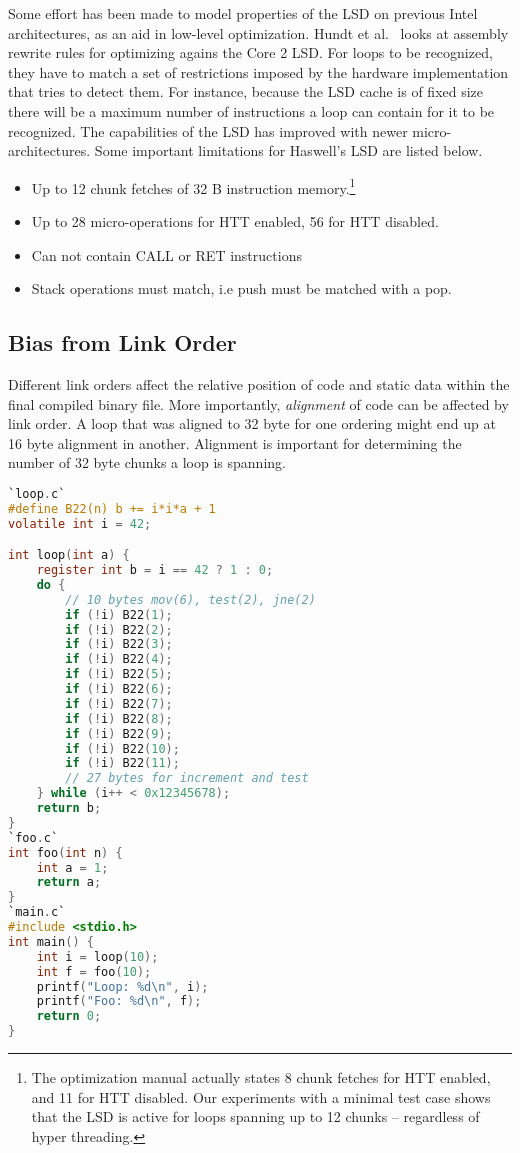 \documentclass[a4paper,10pt,twocolumn,twoside]{article}
\begin{document}
Some effort has been made to model properties of the LSD on previous Intel architectures, as an aid in low-level optimization. 
Hundt et al.~\cite{Hundt:2011:MAO} looks at assembly rewrite rules for optimizing agains the Core 2 LSD.
For loops to be recognized, they have to match a set of restrictions imposed by the hardware implementation that tries to detect them. 
For instance, because the LSD cache is of fixed size there will be a maximum number of instructions a loop can contain for it to be recognized.
The capabilities of the LSD has improved with newer micro-architectures.
Some important limitations for Haswell's LSD are listed below.
\begin{itemize}
  \item Up to 12 chunk fetches of 32 B instruction memory.\footnote{The optimization manual actually states 8 chunk fetches for HTT enabled, and 11 for HTT disabled. Our experiments with a minimal test case shows that the LSD is active for loops spanning up to 12 chunks -- regardless of hyper threading.}
  \item Up to 28 micro-operations for HTT enabled, 56 for HTT disabled.
  \item Can not contain CALL or RET instructions
  \item Stack operations must match, i.e push must be matched with a pop.
\end{itemize}

\subsection{Bias from Link Order}
Different link orders affect the relative position of code and static data within the final compiled binary file.
More importantly, \emph{alignment} of code can be affected by link order.
A loop that was aligned to 32 byte for one ordering might end up at 16 byte alignment in another. 
Alignment is important for determining the number of 32 byte chunks a loop is spanning.

\begin{lstlisting}[language=C, escapeinside=``, caption={Example of bias from link order. Instruction alignment of the loop changes with ordering. }]
`loop.c`
#define B22(n) b += i*i*a + 1
volatile int i = 42;

int loop(int a) {
    register int b = i == 42 ? 1 : 0;
    do {
        // 10 bytes mov(6), test(2), jne(2)
        if (!i) B22(1); 
        if (!i) B22(2);
        if (!i) B22(3);
        if (!i) B22(4);
        if (!i) B22(5);
        if (!i) B22(6);
        if (!i) B22(7);
        if (!i) B22(8);
        if (!i) B22(9);
        if (!i) B22(10);
        if (!i) B22(11);
        // 27 bytes for increment and test
    } while (i++ < 0x12345678);
    return b;
}
`foo.c`
int foo(int n) {
    int a = 1;
    return a;
}
`main.c`
#include <stdio.h>
int main() {
    int i = loop(10);
    int f = foo(10);
    printf("Loop: %d\n", i);
    printf("Foo: %d\n", f);
    return 0;
}
\end{lstlisting}
\end{document}
